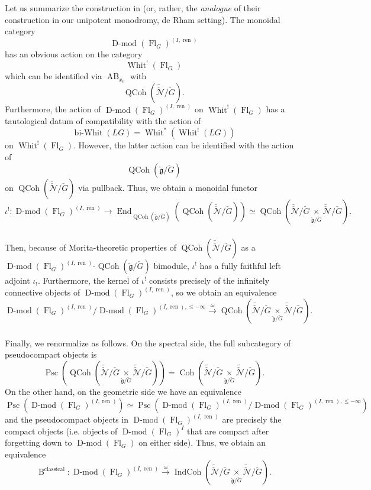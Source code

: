 \documentclass[10pt,a4paper]{amsart}
\newcommand{\on}[1]{\operatorname{#1}}
\newcommand{\Dmod}{\on{D-mod}}
\newcommand{\QCoh}{\on{QCoh}}
\newcommand{\IndCoh}{\on{IndCoh}}
\newcommand{\Gcheck}{\check{G}}
\newcommand{\gcheck}{\check{\mathfrak{g}}}
\newcommand{\sssec}[1]{\subsubsection{}}
\begin{document}
\sssec{}
Let us summarize the construction in \cite{DT} (or, rather, the \emph{analogue} of their construction in our unipotent monodromy, de Rham setting). The monoidal category
$$
\Dmod(\on{Fl}_{G})^{(I, \on{ren})}
$$
has an obvious action on the category
$$
\on{Whit}^!(\on{Fl}_G)
$$
which can be identified via $\on{AB}_{x_0}$ with
$$
\QCoh(\tilde{\check{\mathcal{N}}}/\Gcheck).
$$
Furthermore, the action of $\Dmod(\on{Fl}_{G})^{(I, \on{ren})}$ on $\on{Whit}^!(\on{Fl}_G)$ has a tautological datum of compatibility with the action of
$$
\on{bi-Whit}(LG) = \on{Whit}^*(\on{Whit}^!(LG))
$$
on $\on{Whit}^!(\on{Fl}_G)$. However, the latter action can be identified with the action of
$$
\QCoh(\gcheck/\Gcheck)
$$
on $\QCoh(\tilde{\check{\mathcal{N}}}/\Gcheck)$ via pullback. Thus, we obtain a monoidal functor
$$
\iota^! : \Dmod(\on{Fl}_{G})^{(I, \on{ren})} \longrightarrow \on{End}_{\QCoh(\gcheck/\Gcheck)}(\QCoh(\tilde{\check{\mathcal{N}}}/\Gcheck)) \simeq \QCoh(\tilde{\check{\mathcal{N}}}/\Gcheck \underset{\gcheck/\Gcheck}{\times} \tilde{\check{\mathcal{N}}}/\Gcheck).
$$

\sssec{}
Then, because of Morita-theoretic properties of $\QCoh(\tilde{\check{\mathcal{N}}}/\Gcheck)$ as a $\Dmod(\on{Fl}_{G})^{(I, \on{ren})}$-$\QCoh(\gcheck/\Gcheck)$ bimodule, $\iota^!$ has a fully faithful left adjoint $\iota_!$. Furthermore, the kernel of $\iota^!$ consists precisely of the infinitely connective objects of $\Dmod(\on{Fl}_{G})^{(I, \on{ren})}$, so we obtain an equivalence
$$
\Dmod(\on{Fl}_{G})^{(I, \on{ren})}/\Dmod(\on{Fl}_{G})^{(I, \on{ren}), \leq -\infty} \overset{\simeq}{\longrightarrow} \QCoh(\tilde{\check{\mathcal{N}}}/\Gcheck \underset{\gcheck/\Gcheck}{\times} \tilde{\check{\mathcal{N}}}/\Gcheck).
$$

\sssec{}
Finally, we renormalize as follows. On the spectral side, the full subcategory of pseudocompact objects is
$$
\on{Psc}(\QCoh(\tilde{\check{\mathcal{N}}}/\Gcheck \underset{\gcheck/\Gcheck}{\times} \tilde{\check{\mathcal{N}}}/\Gcheck)) = \on{Coh}(\tilde{\check{\mathcal{N}}}/\Gcheck \underset{\gcheck/\Gcheck}{\times} \tilde{\check{\mathcal{N}}}/\Gcheck).
$$
On the other hand, on the geometric side we have an equivalence
$$
\on{Psc}(\Dmod(\on{Fl}_{G})^{(I, \on{ren})}) \simeq \on{Psc}(\Dmod(\on{Fl}_{G})^{(I, \on{ren})}/\Dmod(\on{Fl}_{G})^{(I, \on{ren}), \leq -\infty})
$$
and the pseudocompact objects in $\Dmod(\on{Fl}_{G})^{(I, \on{ren})}$ are precisely the compact objects (i.e. objects of $\Dmod(\on{Fl}_{G})^{I}$ that are compact after forgetting down to $\Dmod(\on{Fl}_G)$ on either side). Thus, we obtain an equivalence
$$
\on{B}^{\on{classical}} : \Dmod(\on{Fl}_{G})^{(I, \on{ren})} \overset{\simeq}{\longrightarrow} \IndCoh(\tilde{\check{\mathcal{N}}}/\Gcheck \underset{\gcheck/\Gcheck}{\times} \tilde{\check{\mathcal{N}}}/\Gcheck).
$$
\end{document}

